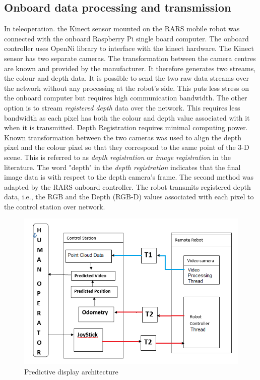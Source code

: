 \subsection{Onboard data processing and transmission}
In teleoperation. the Kinect sensor mounted on the RARS mobile robot was connected with the onboard Raspberry Pi single board computer. The onboard controller uses OpenNi library to interface with the kinect hardware.  The Kinect sensor has two separate cameras. The transformation between the camera centres are known and provided by the manufacturer. It therefore generates two streams, the colour and depth data. It is possible to send the two raw data streams over the network  without any processing at the robot's side. This  puts less stress on the onboard computer but requires high communication bandwidth. The other option is to stream \textit{ registered depth} data over the network. This requires less bandwidth as each pixel has both the colour and depth value associated with it when it is transmitted. Depth Registration requires minimal computing power. Known transformation between the two cameras was used to align the depth pixel and the colour pixel so that they correspond to the same point of the 3-D scene. This is referred to as \textit{depth registration} or \textit{image registration} in the literature. The word "depth" in the   \textit{depth registration} indicates  that the final image data is with respect to  the depth camera's frame. The second method was adapted by the RARS onboard controller. The robot transmits registered depth data, i.e., the RGB and the Depth (RGB-D) values associated with each pixel to the control station over network. 


\begin{figure}
	\includegraphics[width=\linewidth,keepaspectratio]{Chapter7/fig/PredictorBlockDig}
	\caption{Predictive display architecture}	\label{fig:PDBLock}
\end{figure}

